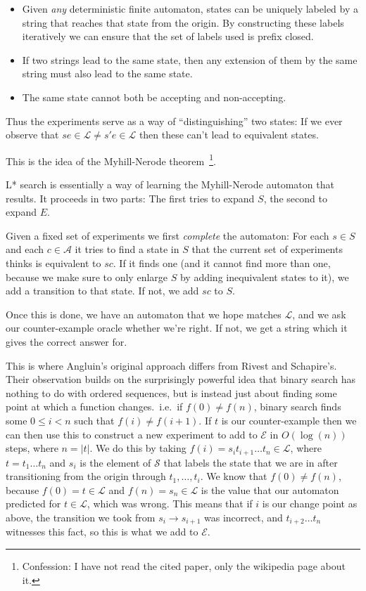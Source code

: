 \documentclass[a4paper]{book}
\begin{document}
\begin{itemize}
\item Given \emph{any} deterministic finite automaton,
states can be uniquely labeled by a string that reaches that state from the origin.
By constructing these labels iteratively we can ensure that the set of labels used is prefix closed.
\item If two strings lead to the same state,
then any extension of them by the same string must also lead to the same state.
\item The same state cannot both be accepting and non-accepting.
\end{itemize}

Thus the experiments serve as a way of ``distinguishing'' two states:
If we ever observe that \(se \in \mathcal{L} \neq s'e \in \mathcal{L}\) then these can't lead to equivalent states.

This is the idea of the Myhill-Nerode theorem~\cite{nerode1958linear}\footnote{Confession:
I have not read the cited paper,
only the wikipedia page about it.
}.

L* search is essentially a way of learning the Myhill-Nerode automaton that results.
It proceeds in two parts:
The first tries to expand \(S\),
the second to expand \(E\).

Given a fixed set of experiments we first \emph{complete} the automaton:
For each \(s \in S\) and each \(c \in \mathcal{A}\) it tries to find a state in \(S\) that the current set of experiments thinks is equivalent to \(sc\).
If it finds one (and it cannot find more than one,
because we make sure to only enlarge \(S\) by adding inequivalent states to it),
we add a transition to that state.
If not,
we add \(sc\) to \(S\).

Once this is done,
we have an automaton that we hope matches \(\mathcal{L}\),
and we ask our counter-example oracle whether we're right.
If not,
we get a string which it gives the correct answer for.

This is where Angluin's original approach differs from Rivest and Schapire's.
Their observation builds on the surprisingly powerful idea that binary search has nothing to do with ordered sequences,
but is instead just about finding some point at which a function changes.\ 
i.e.\ if \(f(0) \neq f(n)\),
binary search finds some \(0 \leq i < n\) such that \(f(i) \neq f(i + 1)\).
If \(t\) is our counter-example then we can then use this to construct a new experiment to add to \(\mathcal{E}\) in \(O(\log(n))\) steps,
where \(n = |t|\).
We do this by taking \(f(i) = s_i t_{i+1} \ldots t_{n} \in \mathcal{L}\),
where \(t = t_1 \ldots t_n\) and \(s_i\) is the element of \(\mathcal{S}\) that labels the state that we are in after transitioning from the origin through
\(t_1, \ldots, t_i\).
We know that \(f(0) \neq f(n)\),
because \(f(0) = t \in \mathcal{L}\) and \(f(n) = s_n \in \mathcal{L}\) is the value that our automaton predicted for \(t \in \mathcal{L}\),
which was wrong.
This means that if \(i\) is our change point as above,
the transition we took from \(s_i \to s_{i + 1}\) was incorrect,
and \(t_{i + 2} \ldots t_n\) witnesses this fact,
so this is what we add to \(\mathcal{E}\).
\end{document}
